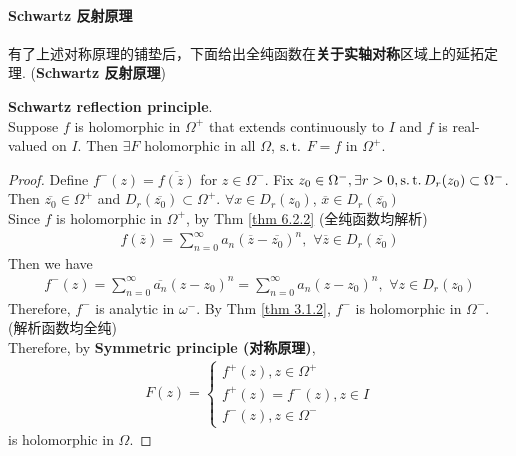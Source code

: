 \paragraph{\textbf{Schwartz} 反射原理}
有了上述对称原理的铺垫后，下面给出全纯函数在\textbf{关于实轴对称}区域上的延拓定理. (\textbf{Schwartz 反射原理})
\begin{thm}\label{thm 6.4.2}
	\textbf{Schwartz reflection principle}. \\
	Suppose $f$ is holomorphic in $\Omega^{+}$ that extends continuously to $I$ and $f$ is real-valued on $I$. Then $\exists F$ holomorphic in all $\Omega$, $\operatorname{s.t.}$ $F = f$ in $\Omega^{+}$.
	
	\vspace{2em}
	\begin{proof}
		Define $f^{-}(z) = \overline{f(\overline{z})}$ for $z \in \Omega^{-}$. Fix $z_0 \in \Omega^{-} , \exists r > 0 , \operatorname{s.t.} D_{r}(z_0) \subset \Omega^{-}$.\\
		Then $\overline{z_0} \in \Omega^{+}$ and $D_{r}(\overline{z_0}) \subset \Omega^{+}$. $\forall x \in D_{r}(z_0)$, $\overline{x} \in D_{r}(\overline{z_0})$\\
		Since $f$ is holomorphic in $\Omega^{+}$, by Thm \ref{thm 6.2.2} (全纯函数均解析)
		\begin{align}
			f(\overline{z}) = \sum_{n = 0}^{\infty}{a_n (\overline{z} - \overline{z_0})^n} , \,\, \forall \overline{z} \in D_{r}(\overline{z_0})
		\end{align}
		Then we have
		\begin{align}
			f^{-}(z) = \sum_{n = 0}^{\infty}{\overline{a_n} (z - z_0)^n} = \sum_{n = 0}^{\infty}{a_n (z - z_0)^n} , \,\, \forall z \in D_{r}(z_0)
		\end{align}
		Therefore, $f^{-}$ is analytic in $\omega^{-}$. By Thm \ref{thm 3.1.2}, $f^{-}$ is holomorphic in $\Omega^{-}$. (解析函数均全纯)\\
		Therefore, by \textbf{Symmetric principle (对称原理)}, 
		\begin{align}
			F(z) = 
			\begin{cases}
				f^{+}(z) , z \in \Omega^{+} \\
				f^{+}(z) = f^{-}(z) , z \in I \\
				f^{-}(z) , z \in \Omega^{-}
			\end{cases}
		\end{align}
		is holomorphic in $\Omega$.
	\end{proof}
\end{thm}

